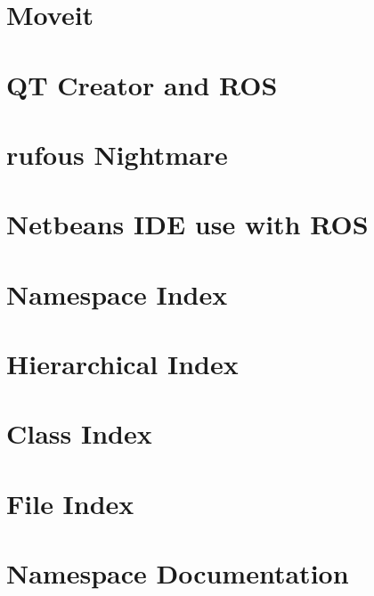\documentclass[twoside]{book}
\begin{document}
\chapter{Moveit}
\label{md_markdown_MoveitRvizNotes}
\hypertarget{md_markdown_MoveitRvizNotes}{}

\chapter{Q\-T Creator and R\-O\-S}
\label{md_markdown_QtCreatorWIthRos}
\hypertarget{md_markdown_QtCreatorWIthRos}{}

\chapter{rufous Nightmare}
\label{md_markdown_rufousdiskproblem}
\hypertarget{md_markdown_rufousdiskproblem}{}

\chapter{Netbeans I\-D\-E use with R\-O\-S}
\label{md_markdown_Running_Netbeans_without_Environment_setup_properly}
\hypertarget{md_markdown_Running_Netbeans_without_Environment_setup_properly}{}

\chapter{Namespace Index}

\chapter{Hierarchical Index}

\chapter{Class Index}

\chapter{File Index}

\chapter{Namespace Documentation}




\end{document}
